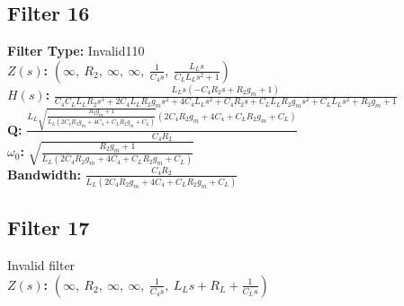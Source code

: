 \documentclass{article}
\begin{document}
\subsection*{Filter 16}
\textbf{Filter Type:} Invalid110 \\ 
\textbf{$Z(s)$:} $\left( \infty, \  R_{2}, \  \infty, \  \infty, \  \frac{1}{C_{4} s}, \  \frac{L_{L} s}{C_{L} L_{L} s^{2} + 1}\right)$ \\ 
\textbf{$H(s)$:} $\frac{L_{L} s \left(- C_{4} R_{2} s + R_{2} g_{m} + 1\right)}{C_{4} C_{L} L_{L} R_{2} s^{3} + 2 C_{4} L_{L} R_{2} g_{m} s^{2} + 4 C_{4} L_{L} s^{2} + C_{4} R_{2} s + C_{L} L_{L} R_{2} g_{m} s^{2} + C_{L} L_{L} s^{2} + R_{2} g_{m} + 1}$ \\ 
\textbf{Q:} $\frac{L_{L} \sqrt{\frac{R_{2} g_{m} + 1}{L_{L} \left(2 C_{4} R_{2} g_{m} + 4 C_{4} + C_{L} R_{2} g_{m} + C_{L}\right)}} \left(2 C_{4} R_{2} g_{m} + 4 C_{4} + C_{L} R_{2} g_{m} + C_{L}\right)}{C_{4} R_{2}}$ \\ 
\textbf{$\omega_0$:} $\sqrt{\frac{R_{2} g_{m} + 1}{L_{L} \left(2 C_{4} R_{2} g_{m} + 4 C_{4} + C_{L} R_{2} g_{m} + C_{L}\right)}}$ \\ 
\textbf{Bandwidth:} $\frac{C_{4} R_{2}}{L_{L} \left(2 C_{4} R_{2} g_{m} + 4 C_{4} + C_{L} R_{2} g_{m} + C_{L}\right)}$ \\ 
\subsection*{Filter 17}
Invalid filter \\ 
\textbf{$Z(s)$:} $\left( \infty, \  R_{2}, \  \infty, \  \infty, \  \frac{1}{C_{4} s}, \  L_{L} s + R_{L} + \frac{1}{C_{L} s}\right)$ \\ 
\end{document}
